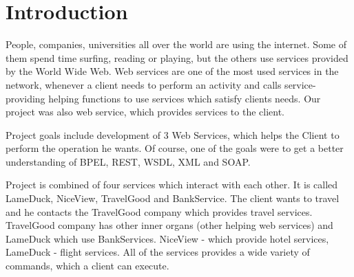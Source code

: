 \section{Introduction}

People, companies, universities all over the world are using the internet. Some of them spend time surfing, reading or playing, but the others use services provided by the World Wide Web. Web services are one of the most used services in the network, whenever a client needs to perform an activity and calls service-providing helping functions to use services which satisfy clients needs. Our project was also web service, which provides services to the client. 

Project goals include development of 3 Web Services, which helps the Client to perform the operation he wants. Of course, one of the goals were to get a better understanding of BPEL, REST, WSDL, XML and SOAP. 

Project is combined of four services which interact with each other. It is called LameDuck, NiceView, TravelGood and BankService. The client wants to travel and he contacts the TravelGood company which provides travel services. TravelGood company has other inner organs (other helping web services) and LameDuck which use BankServices. NiceView - which provide hotel services, LameDuck - flight services. All of the services provides a wide variety of commands, which a client can execute. 
